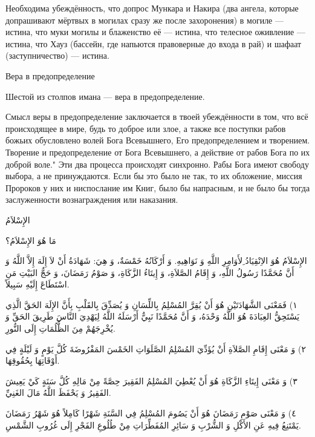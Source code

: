 \documentclass[a5paper]{article}
\begin{document}
Необходима убеждённость, что допрос Мункара и Накира (два анге­ла, которые допрашивают мёртвых в могилах сразу же после захоро­нения) в могиле — истина, что муки могилы и блаженство её — истина, что телесное оживление — истина, что Хауз (бассейн, где напьются правоверные до входа в рай) и шафаат (заступничество) — истина.

Вера в предопределение

Шестой из столпов имана — вера в предопределение.

Смысл веры в предопределение заключается в твоей убеждённости в том, что всё происходящее в мире, будь то доброе или злое, а также все поступки рабов божьих обусловлено волей Бога Всевышнего, Его предопределением и творением. Творение и предоп­ределение от Бога Всевышнего, а действие от рабов Бога по их доброй воле." Эти два процесса происходят синхронно. Рабы Бога имеют свободу выбора, а не принуждаются. Если бы это было не так, то их обложение, миссия Пророков у них и ниспослание им Книг, было бы напрасным, и не было бы тогда заслуженности вознаграждения или наказания.

الإِسْلاَمُ

مَا هُوَ الإِسْلاَمُ؟

الإِسْلاَمُ هُوَ الاِنْقِيَادُ ِلأَوَامِرِ اللَّهِ وَ نَوَاهِيهِ. وَ أَرْكَانُهُ خَمْسَةٌ، وَ هِيَ: شَهَادَةُ أَنْ لاَ إِلَهَ إِلاَّ اللَّهُ وَ أَنَّ مُحَمَّدًا رَسُولُ اللَّهِ، وَ إِقَامُ الصَّلاَةِ، وَ إِيتَاءُ الزَّكَاةِ، وَ صَوْمُ رَمَضَانَ، وَ حَجُّ البَيْتِ مَنِ اسْتَطَاعَ إِلَيْهِ سَبِيلاً.

١) فَمَعْنَى الشَّهَادَتَيْنِ هُوَ أَنْ يُقِرَّ المُسْلِمُ بِاللِّسَانِ وَ يُصَدِّقَ بِالقَلْبِ بِأَنَّ الإِلَهَ الحَقَّ الَّذِي يَسْتَحِقُّ العِبَادَةَ هُوَ اللَّهُ وَحْدَهُ، وَ أَنَّ مُحَمَّدًا نَبِيٌّ أَرْسَلَهُ اللَّهُ لِيَهْدِيَ النَّاسَ طَرِيقَ الحَقِّ وَ يُخْرِجَهُمْ مِنَ الظُّلُمَاتِ إِلَى النُّورِ.

٢) وَ مَعْنَى إِقَامِ الصَّلاَةِ أَنْ يُؤَدِّيَ المُسْلِمُ الصَّلَوَاتِ الخَمْسَ المَفْرُوضَةَ كُلَّ يَوْمٍ وَ لَيْلَةٍ فِي أَوْقَاتِهَا بِحُقُوقِهَا.

٣) وَ مَعْنَى إِيتَاءِ الزَّكَاةِ هُوَ أَنْ يُعْطِيَ المُسْلِمُ الفَقِيرَ حِصَّةً مِنْ مَالِهِ كُلَّ سَنَةٍ كَيْ يَعِيشَ الفَقِيرُ وَ يَحْفَظَ اللَّهُ مَالَ الغَنِيِّ.

٤) وَ مَعْنَى صَوْمِ رَمَضَانَ هُوَ أَنْ يَصُومَ المُسْلِمُ فِي السَّنَةِ شَهْرًا كَامِلاً هُوَ شَهْرُ رَمَضَانَ يَمْتَنِعُ فِيهِ عَنِ الأَكْلِ وَ الشُّرْبِ وَ سَائِرِ المُفَطِّرَاتِ مِنْ طُلُوعِ الفَجْرِ إِلَى غُرُوبِ الشَّمْسِ.
\end{document}
